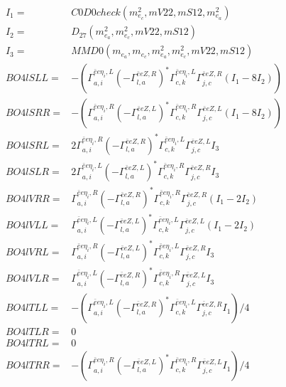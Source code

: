 \documentclass[A4,landscape]{article}
\begin{document}
\begin{align} 
I_1 = & C0D0check(m^2_{e_{{c}}}, mV22, mS12, m^2_{e_{{a}}}) \\ 
I_2 = & D_{27}(m^2_{e_{{a}}}, m^2_{e_{{c}}}, mV22, mS12) \\ 
I_3 = & MMD0(m_{e_{{a}}}, m_{e_{{c}}}, m^2_{e_{{a}}}, m^2_{e_{{c}}}, mV22, mS12) \\ 
  BO4lSLL= & -( \Gamma^{\bar{e}e \eta_i ,L}_{a, i} (- \Gamma^{\bar{e}e Z ,R} _{l, a})^* \Gamma^{\bar{e}e \eta_i ,L}_{c, k} \Gamma^{\bar{e}e Z ,R}_{j, c} (I_1 - 8 I_2)) \\ 
  BO4lSRR= & -( \Gamma^{\bar{e}e \eta_i ,R}_{a, i} (- \Gamma^{\bar{e}e Z ,L} _{l, a})^* \Gamma^{\bar{e}e \eta_i ,R}_{c, k} \Gamma^{\bar{e}e Z ,L}_{j, c} (I_1 - 8 I_2)) \\ 
  BO4lSRL= & 2  \Gamma^{\bar{e}e \eta_i ,R}_{a, i} (- \Gamma^{\bar{e}e Z ,R} _{l, a})^* \Gamma^{\bar{e}e \eta_i ,L}_{c, k} \Gamma^{\bar{e}e Z ,L}_{j, c} I_3 \\ 
  BO4lSLR= & 2  \Gamma^{\bar{e}e \eta_i ,L}_{a, i} (- \Gamma^{\bar{e}e Z ,L} _{l, a})^* \Gamma^{\bar{e}e \eta_i ,R}_{c, k} \Gamma^{\bar{e}e Z ,R}_{j, c} I_3 \\ 
  BO4lVRR= &  \Gamma^{\bar{e}e \eta_i ,R}_{a, i} (- \Gamma^{\bar{e}e Z ,R} _{l, a})^* \Gamma^{\bar{e}e \eta_i ,R}_{c, k} \Gamma^{\bar{e}e Z ,R}_{j, c} (I_1 - 2 I_2) \\ 
  BO4lVLL= &  \Gamma^{\bar{e}e \eta_i ,L}_{a, i} (- \Gamma^{\bar{e}e Z ,L} _{l, a})^* \Gamma^{\bar{e}e \eta_i ,L}_{c, k} \Gamma^{\bar{e}e Z ,L}_{j, c} (I_1 - 2 I_2) \\ 
  BO4lVRL= &  \Gamma^{\bar{e}e \eta_i ,R}_{a, i} (- \Gamma^{\bar{e}e Z ,L} _{l, a})^* \Gamma^{\bar{e}e \eta_i ,L}_{c, k} \Gamma^{\bar{e}e Z ,R}_{j, c} I_3 \\ 
  BO4lVLR= &  \Gamma^{\bar{e}e \eta_i ,L}_{a, i} (- \Gamma^{\bar{e}e Z ,R} _{l, a})^* \Gamma^{\bar{e}e \eta_i ,R}_{c, k} \Gamma^{\bar{e}e Z ,L}_{j, c} I_3 \\ 
  BO4lTLL= & -( \Gamma^{\bar{e}e \eta_i ,L}_{a, i} (- \Gamma^{\bar{e}e Z ,R} _{l, a})^* \Gamma^{\bar{e}e \eta_i ,L}_{c, k} \Gamma^{\bar{e}e Z ,R}_{j, c} I_1)/4 \\ 
  BO4lTLR= & 0 \\ 
  BO4lTRL= & 0 \\ 
  BO4lTRR= & -( \Gamma^{\bar{e}e \eta_i ,R}_{a, i} (- \Gamma^{\bar{e}e Z ,L} _{l, a})^* \Gamma^{\bar{e}e \eta_i ,R}_{c, k} \Gamma^{\bar{e}e Z ,L}_{j, c} I_1)/4 \\ 
\end{align} 
\end{document}
